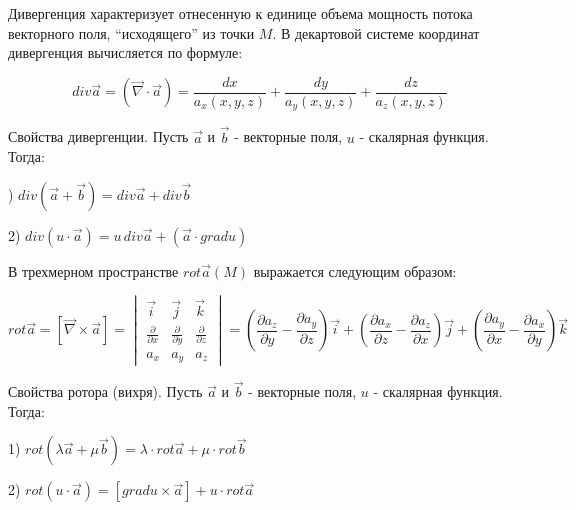 Дивергенция характеризует отнесенную к единице объема мощность потока векторного поля, “исходящего” из точки $M$. В декартовой системе координат дивергенция вычисляется по формуле:

$$div \vec{a} = (\vec{\nabla}\cdot \vec{a})= \frac{dx}{a_x(x,y,z)}+\frac{dy}{a_y(x,y,z)}+\frac{dz}{a_z(x,y,z)}$$

Свойства дивергенции. Пусть $\vec{a}$ и $\vec{b}$ - векторные поля, $u$ - скалярная функция. Тогда:
\par{}) $div(\vec{a}+\vec{b})=div\vec{a}+div\vec{b}$

2) $div(u\cdot\vec{a})=u\, div\vec{a} + (\vec{a}\cdot grad u)$
\par\bigskip

В трехмерном пространстве $rot\vec{a}(M)$ выражается следующим образом:

$$rot\vec{a} = [\vec{\nabla}\times \vec{a}]= \begin{vmatrix} \vec{i} & \vec{j}
& \vec{k}\\
\frac{\partial}{\partial x} & \frac{\partial}{\partial y} & \frac{\partial}{\partial z}\\
a_x & a_y & a_z \end{vmatrix} = \left(\frac{\partial a_z}{\partial y}-\frac{\partial a_y}{\partial z}\right)\vec{i}+
\left(\frac{\partial a_x}{\partial z}-\frac{\partial a_z}{\partial x}\right)\vec{j}+\left(\frac{\partial a_y}{\partial x}-\frac{\partial a_x}{\partial y}\right)\vec{k}$$

Свойства ротора (вихря). Пусть $\vec{a}$ и $\vec{b}$ - векторные поля, $u$ - скалярная функция. Тогда:
\par\bigskip

1) $rot(\lambda\vec{a} + \mu\vec{b}) = \lambda\cdot rot\vec{a} + \mu\cdot rot\vec{b}$

2) $rot(u \cdot \vec{a})=[grad u \times \vec{a}] + u\cdot rot\vec{a}$

